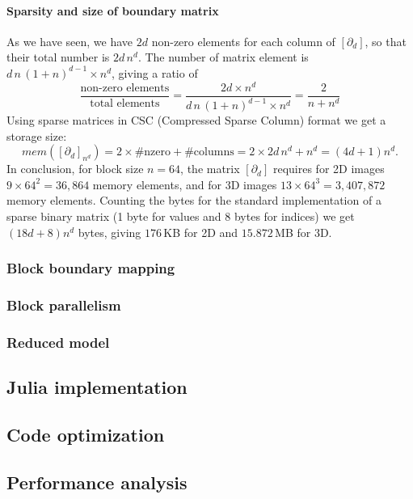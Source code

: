 \paragraph{Sparsity and size of boundary matrix }\label{sec:bbbb} 

As we have seen, we have $2d$ non-zero elements for each column of $[\partial_d]$, so that their total number is $2d\,n^d$. The number of matrix element is $d\,n\,(1+n)^{d-1} \times n^d$, giving a ratio of 
\[
\frac{\mbox{non-zero\ elements}}{\mbox{total\ elements}} = 
\frac{2d\times n^d}{d\,n\,(1+n)^{d-1} \times n^d} =
\frac{2}{n+n^d}
\]
Using sparse matrices in CSC (Compressed Sparse Column) format we get a storage size:
\[
mem([\partial_d]_{n^d}) = 2\times \#\mbox{nzero} + \#\mbox{columns} = 2\times 2d\,n^d + n^d = (4d+1)n^d.
\]
In conclusion, for block size $n=64$, the matrix $[\partial_d]$ requires for 2D images $9\times 64^2=36,864$ memory elements, and for 3D images $13\times 64^3=3,407,872$ memory elements. Counting the bytes for the standard implementation of a sparse binary matrix (1 byte for values and 8 bytes for indices) we get $(18d+8)n^d$ bytes, giving $176$\,KB for 2D and $15.872$\,MB for 3D.

\subsubsection{Block boundary mapping}\label{sec:bbbb}





\subsubsection{Block parallelism}\label{sec:bbbb}

\subsubsection{Reduced model}\label{sec:bbbb}







\subsection{Julia implementation}\label{sec:implementation}


\subsection{Code optimization}\label{sec:optimization}


\subsection{Performance analysis}\label{sec:analysis}

